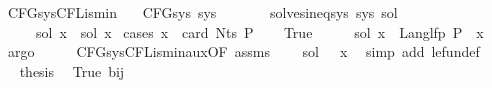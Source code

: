 \begin{isabellebody}
%
\endisadelimproof
\isanewline
{}\isamarkupfalse%
\ CFG{\isacharunderscore}{\kern0pt}sys{\isacharunderscore}{\kern0pt}CFL{\isacharunderscore}{\kern0pt}is{\isacharunderscore}{\kern0pt}min{\isacharcolon}{\kern0pt}\isanewline
\ \ \ {\isachardoublequoteopen}CFG{\isacharunderscore}{\kern0pt}sys\ sys{\isachardoublequoteclose}\isanewline
\ \ \ \ \ \ \ {\isachardoublequoteopen}solves{\isacharunderscore}{\kern0pt}ineq{\isacharunderscore}{\kern0pt}sys\ sys\ sol{\isacharprime}{\kern0pt}{\isachardoublequoteclose}\isanewline
\ \ \ \ \ {\isachardoublequoteopen}sol\ x\ {\isasymsubseteq}\ sol{\isacharprime}{\kern0pt}\ x{\isachardoublequoteclose}\isanewline
%
\isadelimproof
%
\endisadelimproof
%
\isatagproof
{}\isamarkupfalse%
\ {\isacharparenleft}{\kern0pt}cases\ {\isachardoublequoteopen}x\ {\isacharless}{\kern0pt}\ card\ {\isacharparenleft}{\kern0pt}Nts\ P{\isacharparenright}{\kern0pt}{\isachardoublequoteclose}{\isacharparenright}{\kern0pt}\isanewline
\ \ \isamarkupfalse%
\ True\isanewline
\ \ \isamarkupfalse%
\ \isamarkupfalse%
\ {\isachardoublequoteopen}sol\ x\ {\isacharequal}{\kern0pt}\ Lang{\isacharunderscore}{\kern0pt}lfp\ P\ {\isacharparenleft}{\kern0pt}{\isasymgamma}\ x{\isacharparenright}{\kern0pt}{\isachardoublequoteclose}\ \isamarkupfalse%
\ argo\isanewline
\ \ \isamarkupfalse%
\ \isamarkupfalse%
\ CFG{\isacharunderscore}{\kern0pt}sys{\isacharunderscore}{\kern0pt}CFL{\isacharunderscore}{\kern0pt}is{\isacharunderscore}{\kern0pt}min{\isacharunderscore}{\kern0pt}aux{\isacharbrackleft}{\kern0pt}OF\ assms{\isacharbrackright}{\kern0pt}\ \isamarkupfalse%
\ {\isachardoublequoteopen}{\isasymdots}\ {\isasymsubseteq}\ sol{\isacharprime}{\kern0pt}\ {\isacharparenleft}{\kern0pt}{\isasymgamma}{\isacharprime}{\kern0pt}\ {\isacharparenleft}{\kern0pt}{\isasymgamma}\ x{\isacharparenright}{\kern0pt}{\isacharparenright}{\kern0pt}{\isachardoublequoteclose}\ \isamarkupfalse%
\ {\isacharparenleft}{\kern0pt}simp\ add{\isacharcolon}{\kern0pt}\ le{\isacharunderscore}{\kern0pt}fun{\isacharunderscore}{\kern0pt}def{\isacharparenright}{\kern0pt}\isanewline
\ \ \isamarkupfalse%
\ \isamarkupfalse%
\ {\isacharquery}{\kern0pt}thesis\ \isamarkupfalse%
\ True\ bij{\isacharunderscore}{\kern0pt}{\isasymgamma}{\isacharunderscore}{\kern0pt}{\isasymgamma}{\isacharprime}{\kern0pt}\ \isamarkupfalse%

\end{isabellebody}
